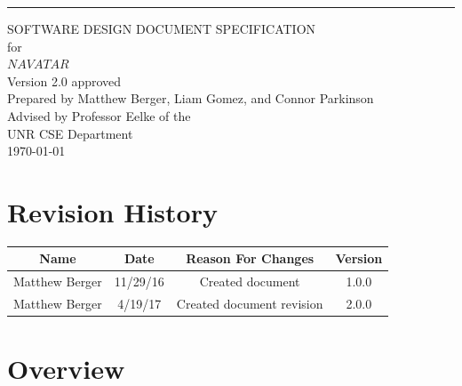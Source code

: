 \documentclass{scrreprt}
\date{}
\def\myversion{2.0 }
\begin{document}
\begin{flushright}
    \rule{16cm}{5pt}\vskip1cm
    \begin{bfseries}
        \Huge{SOFTWARE DESIGN DOCUMENT SPECIFICATION}\\
        \vspace{1.6cm}
        for\\
        \vspace{1.6cm}
        $NAVATAR$\\
        \vspace{1.6cm}
        \LARGE{Version \myversion approved}\\
        \vspace{1.6cm}
        Prepared by Matthew Berger, Liam Gomez, and Connor Parkinson\\ 
        \vspace{1.6cm}
        Advised by Professor Eelke of the\\UNR CSE Department\\
        \vspace{1.6cm}
        \today\\
    \end{bfseries}
\end{flushright}

\tableofcontents

\chapter*{Revision History}

\begin{center}
    \begin{tabular}{|c|c|c|c|}
        \hline
	    Name & Date & Reason For Changes & Version\\
        \hline
	    Matthew Berger & 11/29/16 & Created document & 1.0.0\\
        \hline
        Matthew Berger & 4/19/17 & Created document revision & 2.0.0\\
        \hline
    \end{tabular}
\end{center}

\chapter{Overview}
\end{document}
